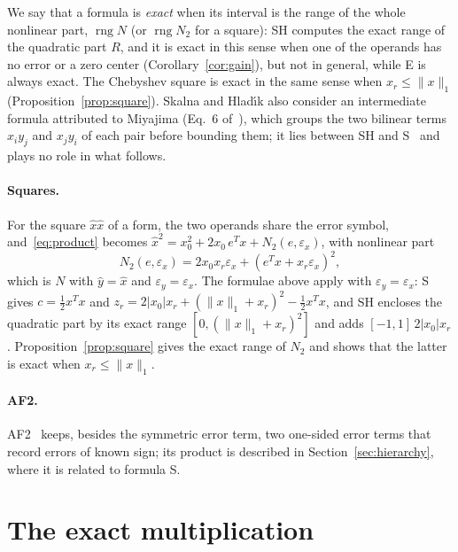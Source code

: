 \documentclass[10pt]{article}
\theoremstyle{definition}
\newcommand{\eps}{\varepsilon}
\newcommand{\ex}{\eps_x}
\newcommand{\ey}{\eps_y}
\newcommand{\rng}{\operatorname{rng}}
\begin{document}
We say that a formula is \emph{exact} when its interval is the range of the whole nonlinear part, $\rng N$ (or $\rng N_2$ for a square): SH computes the exact range of the quadratic part $R$, and it is exact in this sense when one of the operands has no error or a zero center (Corollary~\ref{cor:gain}), but not in general, while E is always exact. The Chebyshev square is exact in the same sense when $x_r\le\|x\|_1$ (Proposition~\ref{prop:square}). Skalna and Hlad\'{\i}k also consider an intermediate formula attributed to Miyajima (Eq.~6 of~\cite{skalna2017new}), which groups the two bilinear terms $x_iy_j$ and $x_jy_i$ of each pair before bounding them; it lies between SH and S~\cite[Prop.~3]{skalna2017new} and plays no role in what follows.

\paragraph{Squares.} For the square $\hat x\hat x$ of a form, the two operands share the error symbol, and~\eqref{eq:product} becomes $\hat x^2=x_0^2+2x_0\,e^Tx+N_2(e,\ex)$, with nonlinear part
\begin{equation}
\label{eq:N2}
N_2(e,\ex)=2x_0x_r\ex+(e^Tx+x_r\ex)^2 ,
\end{equation}
which is $N$ with $\hat y=\hat x$ and $\ey=\ex$. The formulae above apply with $\ey=\ex$: S gives $c=\tfrac12x^Tx$ and $z_r=2|x_0|x_r+(\|x\|_1+x_r)^2-\tfrac12x^Tx$, and SH encloses the quadratic part by its exact range $[0,(\|x\|_1+x_r)^2]$ and adds $[-1,1]\,2|x_0|x_r$. Proposition~\ref{prop:square} gives the exact range of $N_2$ and shows that the latter is exact when $x_r\le\|x\|_1$.

\paragraph{AF2.} AF2~\cite{messine2002extentions} keeps, besides the symmetric error term, two one-sided error terms that record errors of known sign; its product is described in Section~\ref{sec:hierarchy}, where it is related to formula S.

\section{The exact multiplication}
\label{sec:exact}
\end{document}
